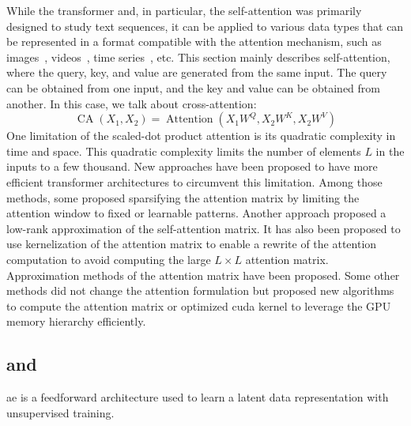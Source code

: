 \documentclass[../main.tex]{subfiles}
\begin{document}
		While the transformer and, in particular, the self-attention was primarily designed to study text sequences, it can be applied to various data types that can be represented in a format compatible with the attention mechanism, such as images~\cite{dosovitskiy2021an}, videos~\cite{ViVIT,Liu2022CVPR}, time series~\cite{ijcai2023p759}, etc.
		This section mainly describes self-attention, where the query, key, and value are generated from the same input.
		The query can be obtained from one input, and the key and value can be obtained from another.
		In this case, we talk about cross-attention:
		\begin{equation}
			\operatorname{CA}\left(X_1, X_2 \right) = \operatorname{Attention} \left(X_1W^Q, X_2W^K, X_2W^V\right) \label{eq:cross_attention}
		\end{equation}
		One limitation of the scaled-dot product attention is its quadratic complexity in time and space.
		This quadratic complexity limits the number of elements \(L\) in the inputs to a few thousand.
		New approaches have been proposed to have more efficient transformer architectures to circumvent this limitation.
		Among those methods, some proposed sparsifying the attention matrix by limiting the attention window to fixed or learnable patterns.
		Another approach proposed a low-rank approximation of the self-attention matrix.
		It has also been proposed to use kernelization of the attention matrix to enable a rewrite of the attention computation to avoid computing the large \(L \times L\) attention matrix.
		Approximation methods of the attention matrix have been proposed.
		Some other methods did not change the attention formulation but proposed new algorithms to compute the attention matrix or optimized cuda kernel to leverage the GPU memory hierarchy efficiently.

	\subsection{ and }
		\Gls{ae} is a feedforward architecture used to learn a latent data representation with unsupervised training.
\end{document}
